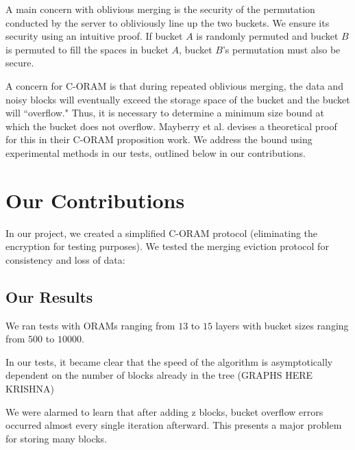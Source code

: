 \documentclass[12pt, oneside]{article}   	%
\begin{document}
A main concern with oblivious merging is the security of the permutation conducted by the server to obliviously line up the two buckets. We ensure its security using an intuitive proof. If bucket $A$ is randomly permuted and bucket $B$ is permuted to fill the spaces in bucket $A$, bucket $B$'s permutation must also be secure. 

A concern for C-ORAM is that during repeated oblivious merging, the data and noisy blocks will eventually exceed the storage space of the bucket and the bucket will ``overflow." Thus, it is necessary to determine a minimum size bound at which the bucket does not overflow. Mayberry et al. devises a theoretical proof for this in their C-ORAM proposition work. We address the bound using experimental methods in our tests, outlined below in our contributions.

\section{Our Contributions}

In our project, we created a simplified C-ORAM protocol (eliminating the encryption for testing purposes). We tested the merging eviction protocol for consistency and loss of data:

\subsection{Our Results}

We ran tests with ORAMs ranging from $13$ to $15$ layers with bucket sizes ranging from $500$ to $10000$.

In our tests, it became clear that the speed of the algorithm is asymptotically dependent on the number of blocks already in the tree (GRAPHS HERE KRISHNA)

We were alarmed to learn that after adding z blocks, bucket overflow errors occurred almost every single iteration afterward. This presents a major problem for storing many blocks.
\end{document}
